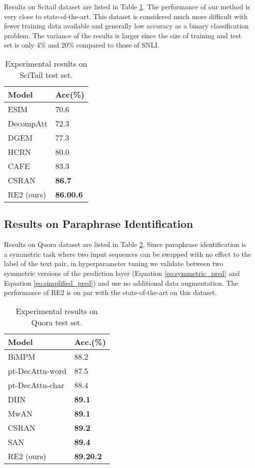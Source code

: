\documentclass[11pt,a4paper]{article}
\begin{document}
Results on Scitail dataset are listed in Table \ref{tab:scitail-result}. The performance of our method is very close to state-of-the-art. This dataset is considered much more difficult with fewer training data available and generally low accuracy as a binary classification problem. The variance of the results is larger since the size of training and test set is only 4\% and 20\% compared to those of SNLI.

\begin{table}
  \centering
  \small
  \begin{tabular}{|l|l|}
  \hline
  {\bf Model} & {\bf Acc(\%)}\\\hline
  ESIM \cite{chen2017enhanced} & 70.6 \\  
  DecompAtt \cite{parikh2016decomposable} & 72.3 \\
  DGEM \cite{scitail} & 77.3 \\
  HCRN \cite{tay2018hermitian} & 80.0 \\
  CAFE \cite{tay2018compare} & 83.3 \\
  CSRAN \cite{tay2018co} & {\bf 86.7} \\\hline
  RE2 (ours) & {\bf 86.00.6} \\\hline
  \end{tabular}
  \caption{Experimental results on SciTail test set.}\label{tab:scitail-result}
\end{table}

\subsection{Results on Paraphrase Identification}
Results on Quora dataset are listed in Table \ref{tab:quora-result}. Since paraphrase identification is a symmetric task where two input sequences can be swapped with no effect to the label of the text pair, in hyperparameter tuning we validate between two symmetric versions of the prediction layer (Equation \ref{eq:symmetric_pred} and Equation \ref{eq:simplified_pred}) and use no additional data augmentation. The performance of RE2 is on par with the state-of-the-art on this dataset. 

\begin{table}
  \centering
  \small
  \begin{tabular}{|l|l|}
  \hline
  {\bf Model} & {\bf Acc.(\%)}\\\hline
    BiMPM \cite{wang2017bilateral} & 88.2 \\
    pt-DecAttn-word \cite{tomar2017neural} & 87.5\\
    pt-DecAttn-char \cite{tomar2017neural} & 88.4\\
    DIIN \cite{gong2018natural} & {\bf 89.1} \\ 
    MwAN \cite{tan2018multiway} & {\bf 89.1} \\
    CSRAN \cite{tay2018co} & {\bf 89.2} \\
    SAN \cite{liu2018stochastic} & {\bf 89.4} \\\hline
    RE2 (ours) & {\bf 89.20.2}
    \\\hline
  \end{tabular}
  \caption{Experimental results on Quora test set. }\label{tab:quora-result}
\end{table}
\end{document}
